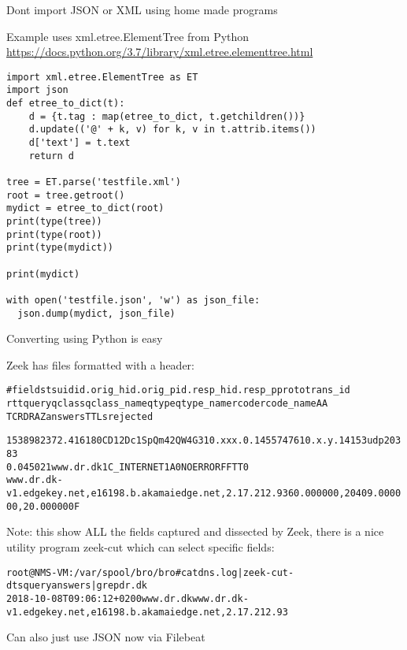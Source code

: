 \documentclass[Screen16to9,17pt]{foils}
\begin{document}
\begin{list2}
\item Dont import JSON or XML using home made programs
\item Example uses xml.etree.ElementTree from Python \url{https://docs.python.org/3.7/library/xml.etree.elementtree.html}
\end{list2}


\begin{verbatim}
import xml.etree.ElementTree as ET
import json
def etree_to_dict(t):
    d = {t.tag : map(etree_to_dict, t.getchildren())}
    d.update(('@' + k, v) for k, v in t.attrib.items())
    d['text'] = t.text
    return d

tree = ET.parse('testfile.xml')
root = tree.getroot()
mydict = etree_to_dict(root)
print(type(tree))
print(type(root))
print(type(mydict))

print(mydict)

with open('testfile.json', 'w') as json_file:
  json.dump(mydict, json_file)
\end{verbatim}

Converting using Python is easy




Zeek has files formatted with a header:
\begin{alltt}\footnotesize
#fields ts      uid     id.orig_h       id.orig_p       id.resp_h       id.resp_p       proto   trans_id
        rtt     query   qclass  qclass_name     qtype   qtype_name      rcode   rcode_name      AA
        TC      RD      RA      Z       answers TTLs    rejected

1538982372.416180	CD12Dc1SpQm42QW4G3	10.xxx.0.145	57476	10.x.y.141	53	udp	20383
	0.045021	www.dr.dk	1	C_INTERNET	1	A	0	NOERROR	F	F	T	T	0
   www.dr.dk-v1.edgekey.net,e16198.b.akamaiedge.net,2.17.212.93	60.000000,20409.000000,20.000000	F
\end{alltt}

Note: this show ALL the fields captured and dissected by Zeek, there is a nice utility program zeek-cut which can select specific fields:

\begin{alltt}\small
root@NMS-VM:/var/spool/bro/bro# cat dns.log | zeek-cut -d ts query answers | grep dr.dk
2018-10-08T09:06:12+0200	www.dr.dk	www.dr.dk-v1.edgekey.net,e16198.b.akamaiedge.net,2.17.212.93
\end{alltt}

Can also just use JSON now via Filebeat




\end{document}
